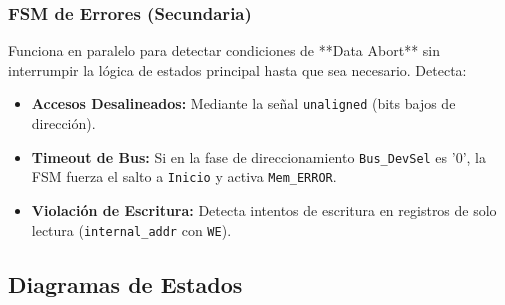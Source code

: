 \documentclass[12pt,a4paper]{article}
\begin{document}
\newpage
\subsubsection{FSM de Errores (Secundaria)}
Funciona en paralelo para detectar condiciones de **Data Abort** sin interrumpir la lógica de estados principal hasta que sea necesario. Detecta:
\begin{itemize}
    \item \textbf{Accesos Desalineados:} Mediante la señal \texttt{unaligned} (bits bajos de dirección).
    \item \textbf{Timeout de Bus:} Si en la fase de direccionamiento \texttt{Bus\_DevSel} es '0', la FSM fuerza el salto a \texttt{Inicio} y activa \texttt{Mem\_ERROR}.
    \item \textbf{Violación de Escritura:} Detecta intentos de escritura en registros de solo lectura (\texttt{internal\_addr} con \texttt{WE}).
\end{itemize}

\subsection{Diagramas de Estados}
\end{document}
